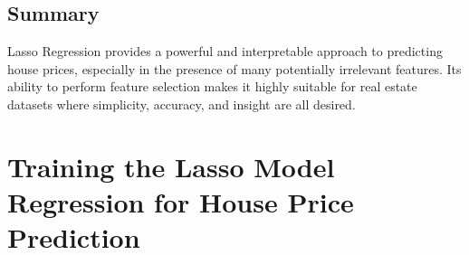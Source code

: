 \documentclass[12pt, a4paper]{report}
\begin{document}
\section{Summary}

Lasso Regression provides a powerful and interpretable approach to predicting house prices, especially in the presence of many potentially irrelevant features. Its ability to perform feature selection makes it highly suitable for real estate datasets where simplicity, accuracy, and insight are all desired.

\chapter{Training the Lasso Model Regression for House
Price Prediction}\
\end{document}
